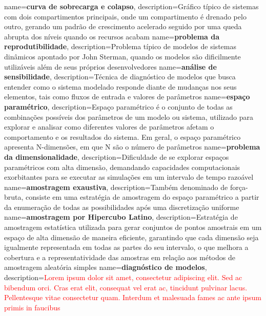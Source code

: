 {
    name=\textbf{curva de sobrecarga e colapso},
    description={Gráfico típico de sistemas com dois compartimentos principais, onde um compartimento é drenado pelo outro, gerando um padrão de crescimento acelerado seguido por uma queda abrupta dos níveis quando os recursos acabam}
}
{
    name=\textbf{problema da reprodutibilidade},
    description={Problema típico de modelos de sistemas dinâmicos apontado por John Sterman, quando os modelos são dificilmente utilizáveis além de seus próprios desenvolvedores}
}
{
    name=\textbf{análise de sensibilidade},
    description={Técnica de diagnóstico de modelos que busca entender como o sistema modelado responde diante de mudanças nos seus elementos, tais como fluxos de entrada e valores de parâmetros}
}
{
    name=\textbf{espaço paramétrico},
    description={Espaço paramétrico é o conjunto de todas as combinações possíveis dos parâmetros de um modelo ou sistema, utilizado para explorar e analisar como diferentes valores de parâmetros afetam o comportamento e os resultados do sistema. Em geral, o espaço paramétrico apresenta N-dimensões, em que N são o número de parâmetros}
}
{
    name=\textbf{problema da dimensionalidade},
    description={Dificuldade de se explorar espaços paramétricos com alta dimensão, demandando capacidades computacionais exorbitantes para se executar as simulações em um intervalo de tempo razoável}
}
{
    name=\textbf{amostragem exaustiva},
    description={Também denominado de força-bruta, consiste em uma estratégia de amostragem do espaço paramétrico a partir da enumeração de todas as possibilidades após uma discretização uniforme}
}
{
    name=\textbf{amostragem por Hipercubo Latino},
    description={Estratégia de amostragem estatística utilizada para gerar conjuntos de pontos amostrais em um espaço de alta dimensão de maneira eficiente, garantindo que cada dimensão seja igualmente representada em todas as partes do seu intervalo, o que melhora a cobertura e a representatividade das amostras em relação aos métodos de amostragem aleatória simples}
}
{
    name=\textbf{diagnóstico de modelos},
    description={\textcolor{red}{Lorem ipsum dolor sit amet, consectetur adipiscing elit. Sed ac bibendum orci. Cras erat elit, consequat vel erat ac, tincidunt pulvinar lacus. Pellentesque vitae consectetur quam. Interdum et malesuada fames ac ante ipsum primis in faucibus}}
}
